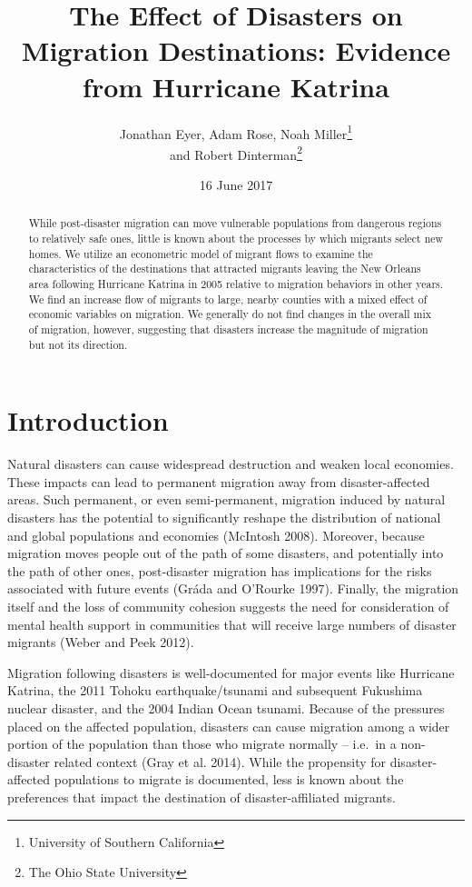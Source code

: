 \documentclass[]{article}
\title{The Effect of Disasters on Migration Destinations: Evidence from
Hurricane Katrina}
\author{Jonathan Eyer, Adam Rose, Noah Miller\footnote{University of Southern
  California} \\ and Robert Dinterman\footnote{The Ohio State University}}
\date{16 June 2017}
\begin{document}
\maketitle
\begin{abstract}
While post-disaster migration can move vulnerable populations from
dangerous regions to relatively safe ones, little is known about the
processes by which migrants select new homes. We utilize an econometric
model of migrant flows to examine the characteristics of the
destinations that attracted migrants leaving the New Orleans area
following Hurricane Katrina in 2005 relative to migration behaviors in
other years. We find an increase flow of migrants to large, nearby
counties with a mixed effect of economic variables on migration. We
generally do not find changes in the overall mix of migration, however,
suggesting that disasters increase the magnitude of migration but not
its direction.
\end{abstract}

\newpage

\section{Introduction}\label{introduction}

Natural disasters can cause widespread destruction and weaken local
economies. These impacts can lead to permanent migration away from
disaster-affected areas. Such permanent, or even semi-permanent,
migration induced by natural disasters has the potential to
significantly reshape the distribution of national and global
populations and economies (McIntosh 2008). Moreover, because migration
moves people out of the path of some disasters, and potentially into the
path of other ones, post-disaster migration has implications for the
risks associated with future events (Gráda and O'Rourke 1997). Finally,
the migration itself and the loss of community cohesion suggests the
need for consideration of mental health support in communities that will
receive large numbers of disaster migrants (Weber and Peek 2012).

Migration following disasters is well-documented for major events like
Hurricane Katrina, the 2011 Tohoku earthquake/tsunami and subsequent
Fukushima nuclear disaster, and the 2004 Indian Ocean tsunami. Because
of the pressures placed on the affected population, disasters can cause
migration among a wider portion of the population than those who migrate
normally -- i.e.~in a non-disaster related context (Gray et al. 2014).
While the propensity for disaster-affected populations to migrate is
documented, less is known about the preferences that impact the
destination of disaster-affiliated migrants.
\end{document}
